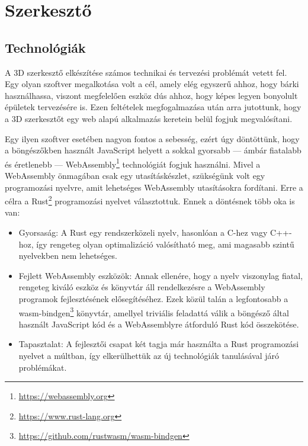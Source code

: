 \section{Szerkesztő}

\subsection{Technológiák}

A 3D szerkesztő elkészítése számos technikai és tervezési problémát vetett fel. Egy olyan szoftver
megalkotása volt a cél, amely elég egyszerű ahhoz, hogy bárki használhassa, viszont megfelelően
eszköz dús ahhoz, hogy képes legyen bonyolult épületek tervezésére is. Ezen feltételek
megfogalmazása után arra jutottunk, hogy a 3D szerkesztőt egy web alapú alkalmazás keretein belül
fogjuk megvalósítani.

Egy ilyen szoftver esetében nagyon fontos a sebesség, ezért úgy döntöttünk, hogy a
böngészőkben használt JavaScript helyett a sokkal gyorsabb --- ámbár fiatalabb és éretlenebb ---
WebAssembly\footnote{\url{https://webassembly.org}} technológiát fogjuk használni. Mivel a
WebAssembly önmagában csak egy utasításkészlet, szükségünk volt egy programozási nyelvre,
amit lehetséges WebAssembly utasításokra fordítani. Erre a célra a
Rust\footnote{\url{https://www.rust-lang.org}}
programozási nyelvet választottuk. Ennek a döntésnek több oka is van:

\begin{itemize}
      \item Gyorsaság: A Rust egy rendszerközeli nyelv, hasonlóan a C-hez vagy C++-hoz, így rengeteg
            olyan optimalizáció valósítható meg, ami magasabb szintű nyelvekben nem lehetséges.

      \item Fejlett WebAssembly eszközök: Annak ellenére, hogy a nyelv viszonylag fiatal, rengeteg
            kiváló eszköz és könyvtár áll rendelkezésre a WebAssembly programok fejlesztésének
            elősegítéséhez. Ezek közül talán a legfontosabb a
            wasm-bindgen\footnote{\url{https://github.com/rustwasm/wasm-bindgen}} könyvtár, amellyel
            triviális feladattá válik a böngésző által használt JavaScript kód és a WebAssemblyre
            átforduló Rust kód összekötése.

      \item Tapasztalat: A fejlesztői csapat két tagja már használta a Rust programozási nyelvet a
            múltban, így elkerülhettük az új technológiák tanulásával járó problémákat.
\end{itemize}

